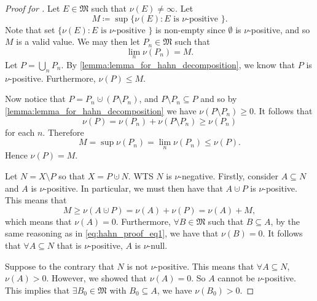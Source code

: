 \documentclass[notoc,notitlepage]{tufte-book}
\begin{document}
\begin{proof}[Proof for ]
  Let $E \in \mathfrak{M}$ such that $\nu(E) \neq \infty$. Let
  \begin{equation*}
    M \coloneqq \sup \{ \nu(E) : E \text{ is } \nu\text{-positive } \}.
  \end{equation*}
  Note that set $\{ \nu(E) : E \text{ is } \nu\text{-positive } \}$ is non-empty
  since $\emptyset$ is $\nu$-positive, and so $M$ is a valid value.
  We may then let $P_n \in \mathfrak{M}$ such that
  \begin{equation*}
    \lim_{n} \nu(P_n) = M.
  \end{equation*}
  Let $P = \bigcup_{n} P_n$.
  By \cref{lemma:lemma_for_hahn_decomposition},
  we know that $P$ is $\nu$-positive.
  Furthermore, $\nu(P) \leq M$.

  Now notice that $P = P_n \cupdot (P \setminus P_n)$,
  and $P \setminus P_n \subseteq P$ and so by
  \cref{lemma:lemma_for_hahn_decomposition}
  we have $\nu(P \setminus P_n) \geq 0$.
  It follows that
  \begin{equation*}
    \nu(P) = \nu(P_n) + \nu(P \setminus P_n) \geq \nu(P_n)
  \end{equation*}
  for each $n$. Therefore
  \begin{equation*}
    M = \sup \nu(P_n) = \lim_{n} \nu(P_n) \leq \nu(P).
  \end{equation*}
  Hence $\nu(P) = M$.

  Let $N = X \setminus P$ so that $X = P \cupdot N$.
  WTS $N$ is $\nu$-negative.
  Firstly, consider $A \subseteq N$ and $A$ is $\nu$-positive.
  In particular, we must then have that $A \cupdot P$ is $\nu$-positive.
  This means that
  \begin{equation}\label{eq:hahn_proof_eq1}
    M \geq \nu(A \cupdot P) = \nu(A) + \nu(P) = \nu(A) + M,
  \end{equation}
  which means that $\nu(A) = 0$.
  Furthermore, $\forall B \in \mathfrak{M}$ such that $B \subseteq A$,
  by the same reasoning as in \cref{eq:hahn_proof_eq1},
  we have that $\nu(B) = 0$.
  It follows that $\forall A \subseteq N$ that is $\nu$-positive,
  $A$ is $\nu$-null.

  Suppose to the contrary that $N$ is not $\nu$-positive.
  This means that $\forall A \subseteq N$, $\nu(A) > 0$.
  However, we showed that $\nu(A) = 0$. So $A$ cannot be $\nu$-positive.
  This implies that $\exists B_0 \in \mathfrak{M}$ with $B_0 \subseteq A$,
  we have $\nu(B_0) > 0$.


\end{proof}
\end{document}
